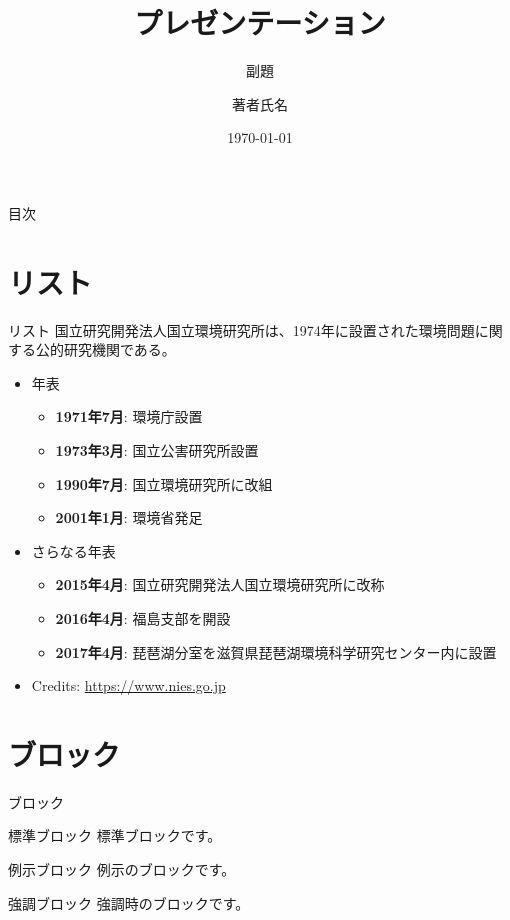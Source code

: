 \documentclass[aspectratio=169,t]{beamer}
\title{プレゼンテーション}
\subtitle{副題}
\author{著者氏名}
\institute{所属}
\date{\today}
\begin{document}
\titleframe

\begin{frame}[t]{目次}
	\tableofcontents
\end{frame}

\section{リスト}
\begin{frame}[t]{リスト}
国立研究開発法人国立環境研究所は、1974年に設置された環境問題に関する公的研究機関である。
	\begin{itemize}
		\item 年表
			\begin{itemize}
				\item \textbf{1971年7月}: 環境庁設置
				\item \textbf{1973年3月}: 国立公害研究所設置
				\item \textbf{1990年7月}: 国立環境研究所に改組
				\item \textbf{2001年1月}: 環境省発足
			\end{itemize}
		\item さらなる年表
			\begin{itemize}
				\item \textbf{2015年4月}: 国立研究開発法人国立環境研究所に改称
				\item \textbf{2016年4月}: 福島支部を開設
				\item \textbf{2017年4月}: 琵琶湖分室を滋賀県琵琶湖環境科学研究センター内に設置
			\end{itemize}
		\item Credits: \url{https://www.nies.go.jp}
	\end{itemize}
\end{frame}

\section{ブロック}
\begin{frame}[t]{ブロック}
	\begin{block}{標準ブロック}
		標準ブロックです。
	\end{block}
	
	\begin{exampleblock}{例示ブロック}
		例示のブロックです。
	\end{exampleblock}
	
	\begin{alertblock}{強調ブロック}
		強調時のブロックです。
	\end{alertblock}
\end{frame}
\end{document}

